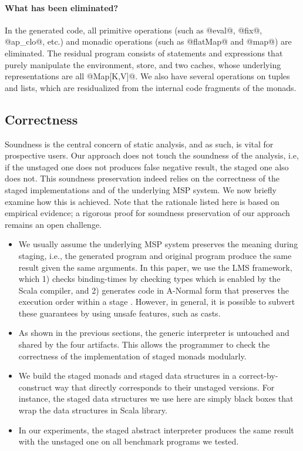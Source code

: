 \paragraph{What has been eliminated?} In the generated code, all
primitive operations (such as @eval@, @fix@, @ap_clo@, etc.) and monadic
operations (such as @flatMap@ and @map@) are eliminated. The residual program
consists of statements and expressions that purely manipulate the environment,
store, and two caches, whose underlying representations are all @Map[K,V]@.
We also have several operations on tuples and lists, which are residualized from
the internal code fragments of the monads. 

\subsection{Correctness}

Soundness is the central concern of static analysis, and as such, is vital for
prospective users. Our approach does not touch the soundness of the analysis,
i.e, if the unstaged one does not produces false negative result, the staged
one also does not. This soundness preservation indeed relies on the correctness
of the staged implementations and of the underlying MSP system. We now briefly
examine how this is achieved. Note that the rationale listed
here is based on empirical evidence; a rigorous proof for soundness
preservation of our approach remains an open challenge.

\begin{itemize}
  \item We usually assume the underlying MSP system preserves the meaning
    during staging, i.e., the generated program and original program produce
    the same result given the same arguments.
    In this paper, we use the LMS framework, which 1) checks binding-times by
    checking types which is enabled by the Scala compiler, and 2) generates
    code in A-Normal form \cite{Flanagan:1993:ECC:155090.155113} that preserves
    the execution order within a stage \cite{DBLP:conf/birthday/Rompf16}.
    However, in general, it is possible to subvert these guarantees by using
    unsafe features, such as casts.
  \item As shown in the previous sections, the generic interpreter is untouched
    and shared by the four artifacts.  This allows the programmer to
    check the correctness of the implementation of staged monads modularly.
  \item We build the staged monads and staged data structures in a
    correct-by-construct way that directly corresponds to their unstaged
    versions. For instance, the staged data structures we use here are simply
    black boxes that wrap the data structures in Scala library.
  \item In our experiments, the staged abstract interpreter produces the same
    result with the unstaged one on all benchmark programs we tested.
\end{itemize}

